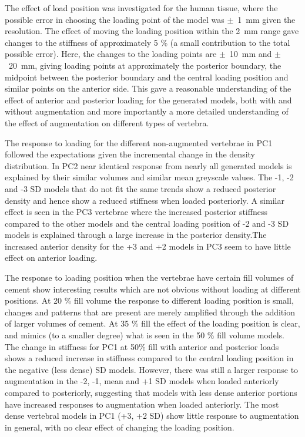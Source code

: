 The effect of load position was investigated for the human tissue, where the
possible error in choosing the loading point of the model was $\pm$~1~mm given
the resolution.  The effect of moving the loading position within the 2~mm
range gave changes to the stiffness of approximately 5 \% (a small contribution
to the total possible error).  Here, the changes to the loading points are
$\pm$~10~mm and $\pm$~20~mm, giving loading points at approximately the
posterior boundary, the midpoint between the posterior boundary and the central
loading position and similar points on the anterior side.  This gave a
reasonable understanding of the effect of anterior and posterior loading for
the generated models, both with and without augmentation and more importantly a
more detailed understanding of the effect of augmentation on different types of
vertebra.

The response to loading for the different non-augmented vertebrae in PC1
followed the expectations given the incremental change in the density
distribution.  In PC2 near identical response from nearly all generated models
is explained by their similar volumes and similar mean greyscale values.  The
-1, -2 and -3 SD models that do not fit the same trends show a reduced
posterior density and hence show a reduced stiffness when loaded posteriorly.
A similar effect is seen in the PC3 vertebrae where the increased posterior
stiffness compared to the other models and the central loading position of -2
and -3 SD models is explained through a large increase in the posterior
density.The increased anterior density for the +3 and +2 models in PC3 seem to
have little effect on anterior loading.

The response to loading position when the vertebrae have certain fill volumes
of cement show interesting results which are not obvious without loading at
different positions.  At 20 \% fill volume the response to different loading
position is small, changes and patterns that are present are merely amplified
through the addition of larger volumes of cement.  At 35 \% fill the effect of
the loading position is clear, and mimics (to a smaller degree) what is seen in
the 50 \% fill volume models.  The change in stiffness for PC1 at 50\% fill
with anterior and posterior loads shows a reduced increase in stiffness
compared to the central loading position in the negative (less dense) SD
models.  However, there was still a larger response to augmentation in the -2,
-1, mean and +1 SD models when loaded anteriorly compared to posteriorly,
suggesting that models with less dense anterior portions have increased
responses to augmentation when loaded anteriorly.  The most dense vertebral
models in PC1 (+3, +2 SD) show little response to augmentation in general, with
no clear effect of changing the loading position.

